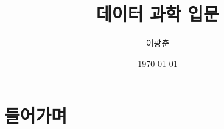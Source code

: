 \documentclass[a4paper]{article}
\title{데이터 과학 입문}
\author{이광춘}
\date{\today}
\begin{document}
	
	
	
	\begin{titlepage}
		\maketitle
	\end{titlepage}

	\section{들어가며}
	\jiwon
	
		
	
\end{document}

